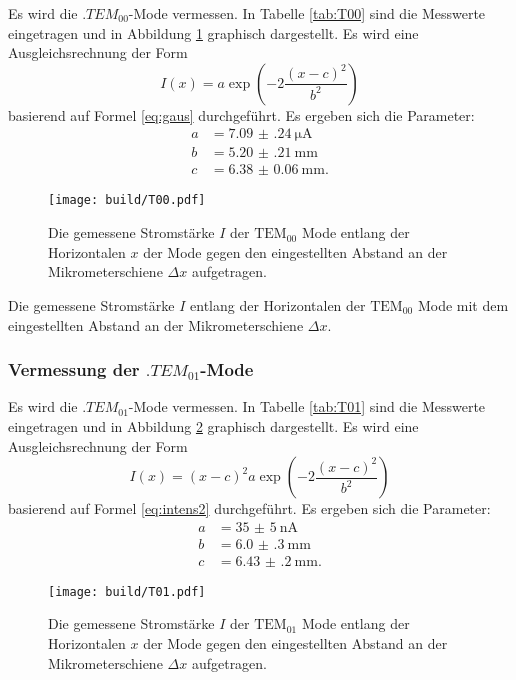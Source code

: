 Es wird die $.{TEM}_{00}$-Mode vermessen.
In Tabelle \ref{tab:T00} sind die Messwerte eingetragen und in Abbildung \ref{fig:T00} graphisch dargestellt.
Es wird eine Ausgleichsrechnung der Form
\[
I(x) = a\exp\left(-2\frac{(x-c)^2}{b^2}\right)
\] 
basierend auf Formel \eqref{eq:gaus} durchgeführt.
Es ergeben sich die Parameter:
\begin{align*}
a &= \SI{7.09(24)}{\micro\ampere}\\
b &= \SI{5.20(21)}{\milli\metre}\\
c &= \SI{6.38(6)}{\milli\metre}\text{.}
\end{align*}

\begin{figure}
	\centering
	\texttt{[image: build/T00.pdf]}
	\caption{Die gemessene Stromstärke $I$ der $\text{TEM}_{00}$ Mode entlang der Horizontalen $x$ der Mode gegen den eingestellten Abstand an der Mikrometerschiene $\Delta x$ aufgetragen.}
	\label{fig:T00}
\end{figure}

\begin{table}
	\centering
	\caption{Die gemessene Stromstärke $I$ entlang der Horizontalen der $\text{TEM}_{\text{00}}$ Mode mit dem eingestellten Abstand an der Mikrometerschiene $\Delta x$.}
	
	\label{tab:T00}
\end{table}


\subsubsection{Vermessung der $.{TEM}_{01}$-Mode}

Es wird die $.{TEM}_{01}$-Mode vermessen.
In Tabelle \ref{tab:T01} sind die Messwerte eingetragen und in Abbildung \ref{fig:T01} graphisch dargestellt.
Es wird eine Ausgleichsrechnung der Form
\[
I(x) = (x-c)^2a\exp\left(-2\frac{(x-c)^2}{b^2}\right)
\] 
basierend auf Formel \eqref{eq:intens2} durchgeführt.
Es ergeben sich die Parameter:
\begin{align*}
a &= \SI{35(5)}{\nano\ampere}\\
b &= \SI{6.0(3)}{\milli\metre}\\
c &= \SI{6.43(20)}{\milli\metre}\text{.}
\end{align*}

\begin{figure}
	\centering
	\texttt{[image: build/T01.pdf]}
	\caption{Die gemessene Stromstärke $I$ der $\text{TEM}_{01}$ Mode entlang der Horizontalen $x$ der Mode gegen den eingestellten Abstand an der Mikrometerschiene $\Delta x$ aufgetragen.}
	\label{fig:T01}
\end{figure}

